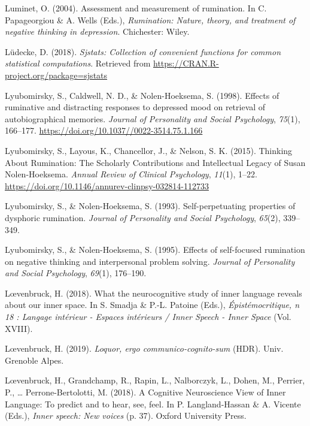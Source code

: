 \documentclass[a4paper,12pt,twoside,openright,oldfontcommands]{memoir}
\begin{document}
\leavevmode\hypertarget{ref-luminet_assessment_2004}{}%
Luminet, O. (2004). Assessment and measurement of rumination. In C. Papageorgiou \& A. Wells (Eds.), \emph{Rumination: Nature, theory, and treatment of negative thinking in depression}. Chichester: Wiley.

\leavevmode\hypertarget{ref-R-sjstats}{}%
Lüdecke, D. (2018). \emph{Sjstats: Collection of convenient functions for common statistical computations}. Retrieved from \url{https://CRAN.R-project.org/package=sjstats}

\leavevmode\hypertarget{ref-Lyubomirsky1998}{}%
Lyubomirsky, S., Caldwell, N. D., \& Nolen-Hoeksema, S. (1998). Effects of ruminative and distracting responses to depressed mood on retrieval of autobiographical memories. \emph{Journal of Personality and Social Psychology}, \emph{75}(1), 166--177. \url{https://doi.org/10.1037//0022-3514.75.1.166}

\leavevmode\hypertarget{ref-lyubomirsky_thinking_2015}{}%
Lyubomirsky, S., Layous, K., Chancellor, J., \& Nelson, S. K. (2015). Thinking About Rumination: The Scholarly Contributions and Intellectual Legacy of Susan Nolen-Hoeksema. \emph{Annual Review of Clinical Psychology}, \emph{11}(1), 1--22. \url{https://doi.org/10.1146/annurev-clinpsy-032814-112733}

\leavevmode\hypertarget{ref-lyubomirsky_self-perpetuating_1993}{}%
Lyubomirsky, S., \& Nolen-Hoeksema, S. (1993). Self-perpetuating properties of dysphoric rumination. \emph{Journal of Personality and Social Psychology}, \emph{65}(2), 339--349.

\leavevmode\hypertarget{ref-lyubomirsky_effects_1995}{}%
Lyubomirsky, S., \& Nolen-Hoeksema, S. (1995). Effects of self-focused rumination on negative thinking and interpersonal problem solving. \emph{Journal of Personality and Social Psychology}, \emph{69}(1), 176--190.

\leavevmode\hypertarget{ref-loevenbruck_what_2018}{}%
Lœvenbruck, H. (2018). What the neurocognitive study of inner language reveals about our inner space. In S. Smadja \& P.-L. Patoine (Eds.), \emph{Épistémocritique, n 18 : Langage intérieur - Espaces intérieurs / Inner Speech - Inner Space} (Vol. XVIII).

\leavevmode\hypertarget{ref-loevenbruck_loquor_2019}{}%
Lœvenbruck, H. (2019). \emph{Loquor, ergo communico-cognito-sum} (HDR). Univ. Grenoble Alpes.

\leavevmode\hypertarget{ref-loevenbruck_cognitive_2018}{}%
Lœvenbruck, H., Grandchamp, R., Rapin, L., Nalborczyk, L., Dohen, M., Perrier, P., \ldots{} Perrone-Bertolotti, M. (2018). A Cognitive Neuroscience View of Inner Language: To predict and to hear, see, feel. In P. Langland-Hassan \& A. Vicente (Eds.), \emph{Inner speech: New voices} (p. 37). Oxford University Press.
\end{document}
